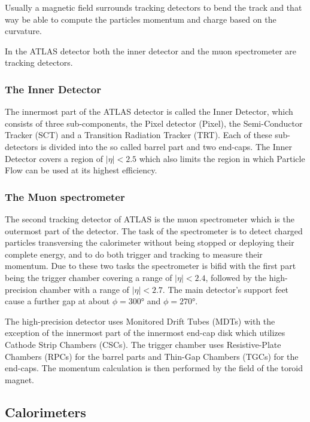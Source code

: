 Usually a magnetic field surrounds tracking detectors to bend the track and that way be able to compute the particles momentum and charge based on the curvature.


In the ATLAS detector both the inner detector and the muon spectrometer are tracking detectors.

\subsubsection{The Inner Detector}

The innermost part of the ATLAS detector is called the Inner Detector, which consists of three sub-components, the Pixel detector (Pixel), the Semi-Conductor Tracker (SCT) and a Transition Radiation Tracker (TRT). Each of these sub-detectors is divided into the so called barrel part and two end-caps. The Inner Detector covers a region of $|\eta| < \num{2.5}$ which also limits the region in which Particle Flow can be used at its highest efficiency.

\subsubsection{The Muon spectrometer}

The second tracking detector of ATLAS is the muon spectrometer which is the outermost part of the detector. The task of the spectrometer is to detect charged particles transversing the calorimeter without being stopped or deploying their complete energy, and to do both trigger and tracking to measure their momentum. Due to these two tasks the spectrometer is bifid with the first part being the trigger chamber covering a range of $|\eta|<2.4$, followed by the high-precision chamber with a range of $|\eta|<2.7$. The main detector's support feet cause a further gap at about $\phi = \ang{300}$ and $\phi = \ang{270}$. 

The high-precision detector uses Monitored Drift Tubes (MDTs) with the exception of the innermost part of the innermost end-cap disk which utilizes Cathode Strip Chambers (CSCs). The trigger chamber uses Resistive-Plate Chambers (RPCs) for the barrel parts and Thin-Gap Chambers (TGCs) for the end-caps. The momentum calculation is then performed by the field of the toroid magnet.



\subsection{Calorimeters}

